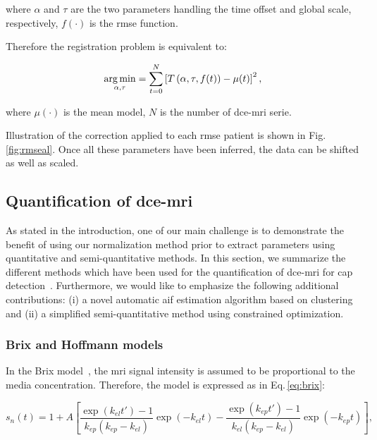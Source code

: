 \noindent where $\alpha$ and $\tau$ are the two parameters handling the time offset and global scale, respectively, $f(\cdot)$ is the \ac{rmse} function.

Therefore the registration problem is equivalent to:

\begin{equation}
  \operatorname*{arg\,min}_{\alpha, \tau} = \sum_{t=0}^{N} \left[ T\left(\alpha, \tau, f(t)\right) - \mu(t) \right]^{2} ,
  \label{eq:cost}
\end{equation}

\noindent where $\mu(\cdot)$ is the mean model, $N$ is the number of \ac{dce}-\ac{mri} serie.

Illustration of the correction applied to each \ac{rmse} patient is shown in Fig.\,\ref{fig:rmseal}.
Once all these parameters have been inferred, the data can be shifted as well as scaled.

\subsection{Quantification of \ac{dce}-\ac{mri}}\label{sec:stateart}

As stated in the introduction, one of our main challenge is to demonstrate the benefit of using our normalization method prior to extract parameters using quantitative and semi-quantitative methods.
In this section, we summarize the different methods which have been used for the quantification of \ac{dce}-\ac{mri} for \ac{cap} detection~\citep{lemaitre2015computer}.
Furthermore, we would like to emphasize the following additional contributions: (i) a novel automatic \ac{aif} estimation algorithm based on clustering and (ii) a simplified semi-quantitative method using constrained optimization.

\subsubsection{Brix and Hoffmann models}\label{sec:brixhoffmann}

In the Brix model~\citep{brix1991pharmacokinetic}, the \ac{mri} signal intensity is assumed to be proportional to the media concentration.
Therefore, the model is expressed as in Eq.\,\eqref{eq:brix}:

\begin{equation}
  s_n(t) = 1 + A \left[ \frac{\exp(k_{el} t') - 1}{k_{ep}(k_{ep} - k_{el})} \exp(- k_{el} t) - \frac{\exp(k_{ep} t') - 1}{k_{el}(k_{ep} - k_{el})} \exp(- k_{ep} t) \right],
  \label{eq:brix}
\end{equation}

